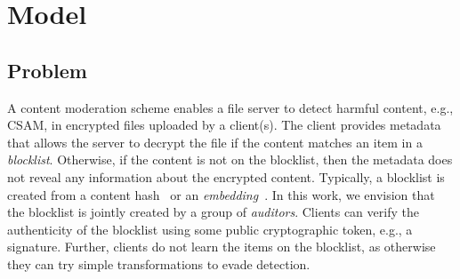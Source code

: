 \section{Model}
\label{sec:model}
%



\subsection{Problem}
%

A content moderation scheme enables a file server to detect harmful content, e.g., 
CSAM, in encrypted files uploaded by a client(s). The client provides metadata that allows the server to decrypt the file if the content matches an item in a \textit{blocklist}. Otherwise, if the content is not on the blocklist, then the 
metadata does not reveal any information about the encrypted content. Typically, a blocklist 
is created from a content hash~\cite{bhowmick2021apple} or an 
\textit{embedding}~\cite{du2020perceptual, lu2017deep, raginsky2009locality}. In this work, we envision that the blocklist is jointly created by a group of \emph{auditors}. Clients can verify the authenticity of the blocklist using some public cryptographic token, e.g., a signature. Further, clients do not learn the items on the blocklist, as otherwise they can try simple transformations to evade detection. 


